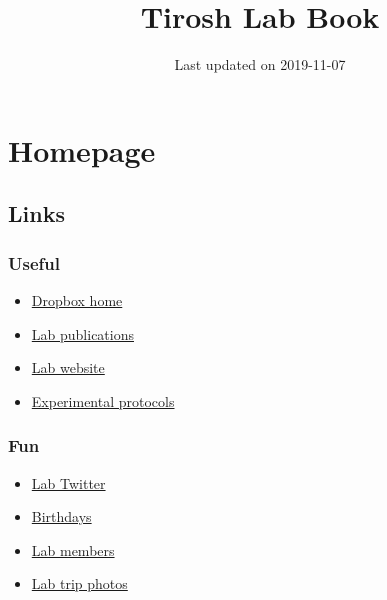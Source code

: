 \documentclass[]{book}
\title{Tirosh Lab Book}
\author{}
\date{Last updated on 2019-11-07}
\providecommand{\tightlist}{%
  \setlength{\itemsep}{0pt}\setlength{\parskip}{0pt}}
\begin{document}
\maketitle

{
\setcounter{tocdepth}{1}
\tableofcontents
}
\chapter{Homepage}\label{homepage}

\section{Links}\label{links}

\subsection{Useful}\label{useful}

\begin{itemize}
\tightlist
\item
  \href{https://www.dropbox.com/home/Tirosh\%20Lab}{Dropbox home}\\
\item
  \href{http://www.weizmann.ac.il/mcb/tirosh/publications-0}{Lab
  publications}\\
\item
  \href{http://www.weizmann.ac.il/mcb/tirosh/}{Lab website}\\
\item
  \href{https://www.dropbox.com/sh/javjoi26i5k5f6t/AADAX4RgSZUFuBwtS6TRE3wua?dl=0}{Experimental
  protocols}
\end{itemize}

\subsection{Fun}\label{fun}

\begin{itemize}
\tightlist
\item
  \href{https://twitter.com/tiroshlab}{Lab Twitter}\\
\item
  \href{https://www.dropbox.com/s/zwss5fg9rkoz7pp/lab\%20bday\%20list.xlsx?dl=0}{Birthdays}\\
\item
  \href{http://www.weizmann.ac.il/mcb/tirosh/group-members}{Lab
  members}\\
\item
  \href{http://www.weizmann.ac.il/mcb/tirosh/pictures}{Lab trip photos}
\end{itemize}
\end{document}
